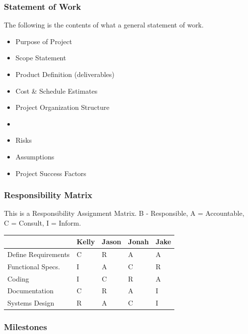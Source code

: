 \documentclass[english, 11pt]{article}
\begin{document}
\subsubsection{Statement of Work}
The following is the contents of what a general statement of work.
\begin{itemize}
    \item Purpose of Project
    \item Scope Statement
    \item Product Definition (deliverables)
    \item Cost \& Schedule Estimates
    \item Project Organization Structure
    \item {}
    \item Risks
    \item Assumptions
    \item Project Success Factors
\end{itemize}

\subsubsection{Responsibility Matrix }\label{ram}

\begin{exmp}
This is a Responsibility Assignment Matrix. B - Responsible, A = Accountable, C = Consult, I = Inform.
\begin{center}
\begin{tabular}{|l|l|l|l|l|}
  \hline
  ~                  & Kelly & Jason & Jonah & Jake \\ \hline
  Define Requirements & C     & R     & A     & A    \\
  Functional Specs.  & I     & A     & C     & R    \\
  Coding             & I     & C     & R     & A    \\
  Documentation      & C     & R     & A     & I    \\
  Systems Design     & R     & A     & C     & I    \\ \hline
\end{tabular}
\end{center}
\end{exmp}

\subsubsection{Milestones}
\end{document}
